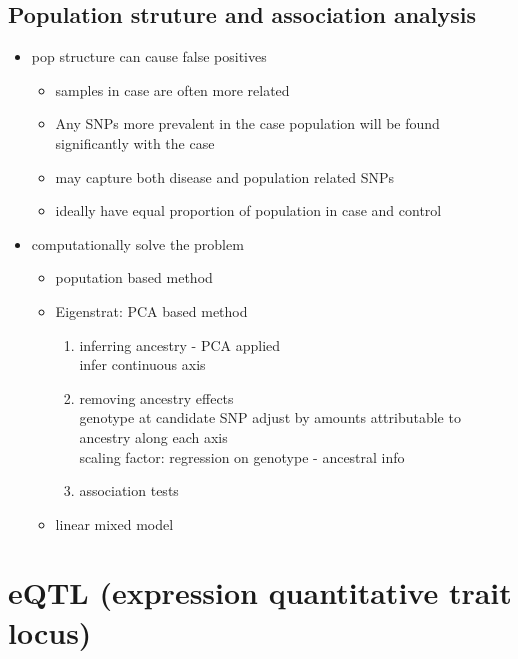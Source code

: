 \documentclass[font=12pt]{article}
\begin{document}
\subsection{Population struture and association analysis}
\begin{itemize}
	\item pop structure can cause false positives
	\begin{itemize}
		\item samples in case are often more related 
		\item Any SNPs more prevalent in the case population will be found significantly with the case 
		\item may capture both disease and population related SNPs
		\item ideally have equal proportion of population in case and control
	\end{itemize}
	\item computationally solve the problem
	\begin{itemize}
		\item poputation based method
		\item Eigenstrat: PCA based method
		\begin{enumerate}
			\item inferring ancestry - PCA applied\\
			infer continuous axis
			\item removing ancestry effects\\
			genotype at candidate SNP adjust by amounts attributable to ancestry along each axis\\
			scaling factor: regression on genotype - ancestral info\\
			\item association tests
		\end{enumerate}
		\item linear mixed model
	\end{itemize}
\end{itemize}
\newpage
\section{eQTL (expression quantitative trait locus)}
\end{document}
